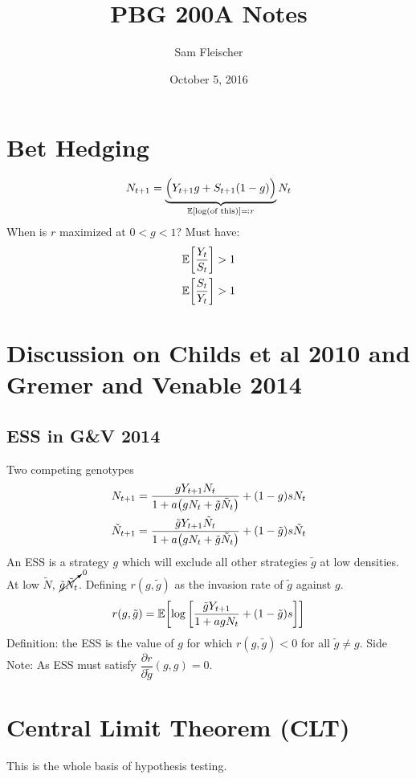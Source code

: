 \documentclass{article}
\title{PBG 200A Notes}
\author{Sam Fleischer}
\date{October 5, 2016}
\newcommand{\expec}{\mathbb{E}}
\begin{document}
    \maketitle

    \section{Bet Hedging}
        \begin{align*}
            N_{t+1} = \underbrace{\Big(Y_{t+1}g + S_{t+1}(1-g)\Big)}_{\expec\qty[\log(\text{of this})] \eqqcolon r}N_t
        \end{align*}
        When is $r$ maximized at $0 < g < 1$?  Must have:
        \begin{align*}
            \expec\qty[\frac{Y_t}{S_t}] > 1 \\
            \expec\qty[\frac{S_t}{Y_t}] > 1
        \end{align*}
    \section{Discussion on Childs et al 2010 and Gremer and Venable 2014}
        \subsection{ESS in G\&V 2014}
            Two competing genotypes
            \begin{align*}
                N_{t+1} = \frac{gY_{t+1}N_t}{1 + a\qty(gN_t + \tilde{g}\tilde{N}_t)} + (1 - g)sN_t \\
                \tilde{N}_{t+1} = \frac{\tilde{g}Y_{t+1}\tilde{N}_t}{1 + a\qty(gN_t + \tilde{g}\tilde{N}_t)} + (1 - \tilde{g})s\tilde{N}_t
            \end{align*}
            An ESS is a strategy $g$ which will exclude all other strategies $\tilde{g}$ at low densities.  At low $\tilde{N}$, $\cancelto{0}{\tilde{g}\tilde{N_t}}$.  Defining $r(g,\tilde{g})$ as the invasion rate of $\tilde{g}$ against $g$.
            \begin{align}
                r(g,\tilde{g}) = \expec\qty[\log\qty[\frac{\tilde{g}Y_{t+1}}{1 + agN_t} + (1 - \tilde{g})s]]
            \end{align}
            Definition: the ESS is the value of $g$ for which $r(g,\tilde{g})<0$ for all $\tilde{g} \neq g$.  Side Note: As ESS must satisfy $\dfrac{\partial r}{\partial \tilde{g}}(g,g) = 0$.
    \section{Central Limit Theorem (CLT)}
        This is the whole basis of hypothesis testing.
\end{document}
